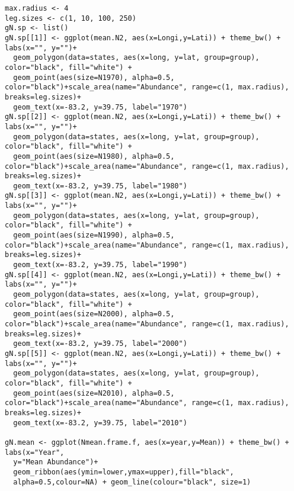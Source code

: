 \documentclass[12pt]{article}
\begin{document}
\begin{verbatim}
max.radius <- 4
leg.sizes <- c(1, 10, 100, 250)
gN.sp <- list()
gN.sp[[1]] <- ggplot(mean.N2, aes(x=Longi,y=Lati)) + theme_bw() + labs(x="", y="")+
  geom_polygon(data=states, aes(x=long, y=lat, group=group), color="black", fill="white") +
  geom_point(aes(size=N1970), alpha=0.5, color="black")+scale_area(name="Abundance", range=c(1, max.radius), breaks=leg.sizes)+
  geom_text(x=-83.2, y=39.75, label="1970")
gN.sp[[2]] <- ggplot(mean.N2, aes(x=Longi,y=Lati)) + theme_bw() + labs(x="", y="")+
  geom_polygon(data=states, aes(x=long, y=lat, group=group), color="black", fill="white") +
  geom_point(aes(size=N1980), alpha=0.5, color="black")+scale_area(name="Abundance", range=c(1, max.radius), breaks=leg.sizes)+
  geom_text(x=-83.2, y=39.75, label="1980")
gN.sp[[3]] <- ggplot(mean.N2, aes(x=Longi,y=Lati)) + theme_bw() + labs(x="", y="")+
  geom_polygon(data=states, aes(x=long, y=lat, group=group), color="black", fill="white") +
  geom_point(aes(size=N1990), alpha=0.5, color="black")+scale_area(name="Abundance", range=c(1, max.radius), breaks=leg.sizes)+
  geom_text(x=-83.2, y=39.75, label="1990")
gN.sp[[4]] <- ggplot(mean.N2, aes(x=Longi,y=Lati)) + theme_bw() + labs(x="", y="")+
  geom_polygon(data=states, aes(x=long, y=lat, group=group), color="black", fill="white") +
  geom_point(aes(size=N2000), alpha=0.5, color="black")+scale_area(name="Abundance", range=c(1, max.radius), breaks=leg.sizes)+
  geom_text(x=-83.2, y=39.75, label="2000")
gN.sp[[5]] <- ggplot(mean.N2, aes(x=Longi,y=Lati)) + theme_bw() + labs(x="", y="")+
  geom_polygon(data=states, aes(x=long, y=lat, group=group), color="black", fill="white") +
  geom_point(aes(size=N2010), alpha=0.5, color="black")+scale_area(name="Abundance", range=c(1, max.radius), breaks=leg.sizes)+
  geom_text(x=-83.2, y=39.75, label="2010")

gN.mean <- ggplot(Nmean.frame.f, aes(x=year,y=Mean)) + theme_bw() + labs(x="Year",
  y="Mean Abundance")+
  geom_ribbon(aes(ymin=lower,ymax=upper),fill="black",
  alpha=0.5,colour=NA) + geom_line(colour="black", size=1) 


\end{verbatim}
\end{document}
